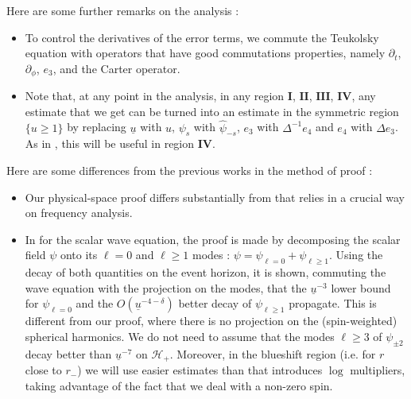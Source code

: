 \documentclass[reqno]{amsart}
\numberwithin{equation}{section}
\newcommand{\quatre}{\mathbf{IV}}
\newcommand{\mch}{\mathcal{H}}
\newcommand{\ubar}{{\underline{u}}}
\newcommand{\psihat}{\widehat{\psi}}
\newcommand{\un}{\mathbf{I}}
\newcommand{\deux}{\mathbf{II}}
\newcommand{\trois}{\mathbf{III}}
\theoremstyle{plain}
\theoremstyle{definition}
\theoremstyle{remark}
\numberwithin{equation}{section}
\begin{document}
\begin{rem}Here are some further remarks on the analysis :

\begin{itemize}
    \item To control the derivatives of the error terms, we commute the Teukolsky equation with operators that have good commutations properties, namely $\partial_t$, $\partial_\phi$, $e_3$, and the Carter operator.
    \item Note that, at any point in the analysis, in any region $\un$, $\deux$, $\trois$, $\quatre$, any estimate that we get can be turned into an estimate in the symmetric region $\{u\geq 1\}$ by replacing $\ubar$ with $u$, $\psi_s$ with $\psihat_{-s}$, $e_3$ with $\Delta^{-1}e_4$ and $e_4$ with $\Delta e_3$. As in \cite{scalarMZ}, this will be useful in region $\quatre$. 
\end{itemize}
Here are some differences from the previous works in the method of proof :

\begin{itemize}
    \item Our physical-space proof differs substantially from \cite{sbierski} that relies in a crucial way on frequency analysis.
    \item In \cite{scalarMZ} for the scalar wave equation, the proof is made by decomposing the scalar field $\psi$ onto its $\ell=0$ and $\ell\geq 1$ modes : $\psi=\psi_{\ell=0}+\psi_{\ell\geq 1}$. Using the decay of both quantities on the event horizon, it is shown, commuting the wave equation with the projection on the modes, that the $\ubar^{-3}$ lower bound for $\psi_{\ell=0}$ and the $O(\ubar^{-4-\delta})$ better decay of $\psi_{\ell\geq 1}$ propagate. This is different from our proof, where there is no projection on the (spin-weighted) spherical harmonics. We do not need to assume that the modes $\ell\geq 3$ of $\psi_{\pm 2}$ decay better than $\ubar^{-7}$ on $\mch_+$. Moreover, in the blueshift region (i.e. for $r$ close to $r_-$) we will use easier estimates than \cite{scalarMZ} that introduces $\log$ multipliers, taking advantage of the fact that we deal with a non-zero spin.
\end{itemize}



\end{rem}
\end{document}

